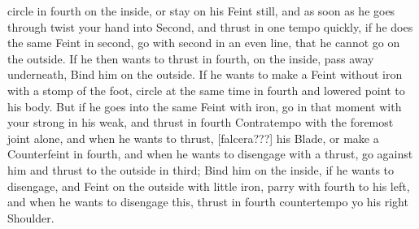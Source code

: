 \newpage


\newpage


circle in fourth on the inside, or stay on his Feint still, and as
soon as he goes through twist your hand into Second, and thrust in one
tempo quickly, if he does the same Feint in second, go with second in
an even line, that he cannot go on the outside. If he then wants to
thrust in fourth, on the inside, pass away underneath, Bind him on the
outside. If he wants to make a Feint without iron with a stomp of the
foot, circle at the same time in fourth and lowered point to his
body. But if he goes into the same Feint with iron, go in that moment
with your strong in his weak, and thrust in fourth Contratempo with
the foremost joint alone, and when he wants to thrust,
[falcera???]
his Blade, or make a Counterfeint in fourth, and when he wants to
disengage with a thrust, go against him and thrust to the outside in
third; Bind him on the inside, if he wants to disengage, and Feint on
the outside with little iron, parry with fourth to his left, and when
he wants to disengage this, thrust in fourth countertempo yo his right
Shoulder.


